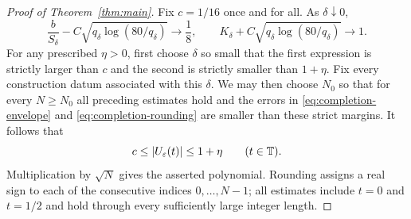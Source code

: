\begin{proof}[Proof of Theorem~\ref{thm:main}]
Fix $c=1/16$ once and for all. As $\delta\downarrow0$,
\[
 \frac b{S_\delta}
       -C\sqrt{q_\delta\log(80/q_\delta)}\longrightarrow\frac18,
 \qquad
 K_\delta+C\sqrt{q_\delta\log(80/q_\delta)}\longrightarrow1.
\]
For any prescribed $\eta>0$, first choose $\delta$ so small that the
first expression is strictly larger than $c$ and the second is strictly
smaller than $1+\eta$. Fix every construction datum associated with this
$\delta$. We may then choose $N_0$ so that for every $N\ge N_0$ all preceding
estimates hold and the errors in \eqref{eq:completion-envelope} and
\eqref{eq:completion-rounding} are smaller than these strict margins.
It follows that
\[
 c\le|U_\varepsilon(t)|\le1+\eta\qquad(t\in\mathbb T).
\]
Multiplication by $\sqrt N$ gives the asserted polynomial. Rounding assigns
a real sign to each of the consecutive indices $0,\ldots,N-1$; all
estimates include $t=0$ and $t=1/2$ and hold through every sufficiently
large integer length.
\end{proof}
